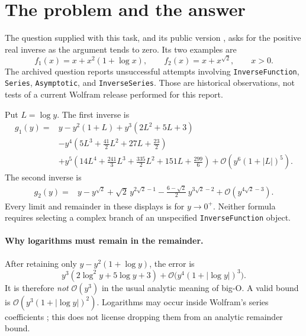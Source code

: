 \documentclass[11pt,a4paper]{article}
\numberwithin{equation}{section}
\theoremstyle{definition}
\theoremstyle{remark}
\newcommand{\OO}{\mathcal O}
\begin{document}
\tableofcontents
\clearpage

\section{The problem and the answer}
\label{sec:answer}

The question supplied with this task, and its public version
\cite{question}, asks for the positive real inverse as the argument tends to
zero. Its two examples are
\begin{equation}
 f_1(x)=x+x^2(1+\log x),\qquad
 f_2(x)=x+x^{\sqrt2},\qquad x>0.
\end{equation}
The archived question reports unsuccessful attempts involving
\texttt{InverseFunction}, \texttt{Series}, \texttt{Asymptotic}, and
\texttt{InverseSeries}. Those are historical observations, not tests of a
current Wolfram release performed for this report.

Put $L=\log y$. The first inverse is
\begin{align}
 g_1(y)={}&y-y^2(1+L)+y^3(2L^2+5L+3)\nonumber\\
 &-y^4\left(5L^3+\frac{41}{2}L^2+27L+\frac{23}{2}\right)\nonumber\\
 &+y^5\left(14L^4+\frac{241}{3}L^3+\frac{335}{2}L^2
                      +151L+\frac{299}{6}\right)
 +\OO\left(y^6(1+|L|)^5\right).
 \label{eq:first-answer}
\end{align}
The second inverse is
\begin{align}
 g_2(y)={}&y-y^{\sqrt2}+\sqrt2\,y^{2\sqrt2-1}
 -\frac{6-\sqrt2}{2}\,y^{3\sqrt2-2}
 +\OO\left(y^{4\sqrt2-3}\right).
 \label{eq:second-answer}
\end{align}
Every limit and remainder in these displays is for $y\to0^+$.
Neither formula requires selecting a complex branch of an unspecified
\texttt{InverseFunction} object.

\paragraph{Why logarithms must remain in the remainder.}
After retaining only $y-y^2(1+\log y)$, the error is
\begin{equation}
 y^3(2\log^2y+5\log y+3)
 +\OO\bigl(y^4(1+|\log y|)^3\bigr).
 \label{eq:not-o-y3}
\end{equation}
It is therefore \emph{not} $\OO(y^3)$ in the usual analytic meaning of
big-O. A valid bound is $\OO(y^3(1+|\log y|)^2)$. Logarithms may occur inside
Wolfram's series coefficients \cite{wlseriesdata,wlseries}; this does not
license dropping them from an analytic remainder bound.
\end{document}
